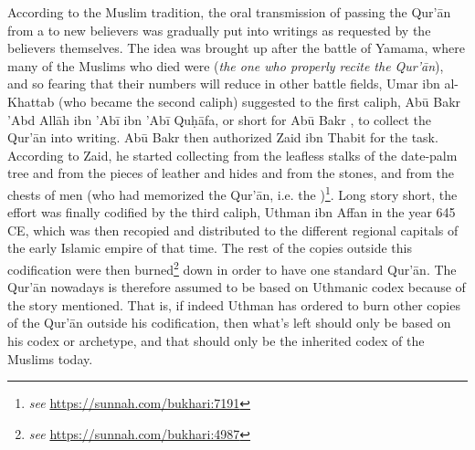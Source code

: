 According to the Muslim tradition, the oral transmission of passing the Qur'\=an from a   to new believers was gradually put into writings as requested by the believers themselves. The idea was brought up after the battle of Yamama, where many of the Muslims who died were   (\textit{the one who properly recite the Qur'\=an}), and so fearing that their numbers will reduce in other battle fields, Umar ibn al-Khattab  (who became the second caliph) suggested to the first caliph, Ab\=u Bakr 'Abd All\=ah ibn 'Ab\=i ibn 'Ab\=i Qu\d{h}\=afa,  or short for Ab\=u Bakr , to collect the Qur'\=an into writing. Ab\=u Bakr then authorized Zaid ibn Thabit  for the task. According to Zaid, he started collecting from the leafless stalks of the date-palm tree and from the pieces of leather and hides and from the stones, and from the chests of men (who had memorized the Qur'\=an, i.e. the  )\footnote{\textit{see} \url{https://sunnah.com/bukhari:7191}}. Long story short, the effort was finally codified by the third caliph, Uthman ibn Affan  in the year 645 CE, which was then recopied and distributed to the different regional capitals of the early Islamic empire of that time. The rest of the copies outside this codification were then burned\footnote{\textit{see} \url{https://sunnah.com/bukhari:4987}} down in order to have one standard Qur'\=an. The Qur'\=an nowadays is therefore assumed to be based on Uthmanic codex because of the story mentioned. That is, if indeed Uthman has ordered to burn other copies of the Qur'\=an outside his codification, then what's left should only be based on his codex or archetype, and that should only be the inherited codex of the Muslims today.


